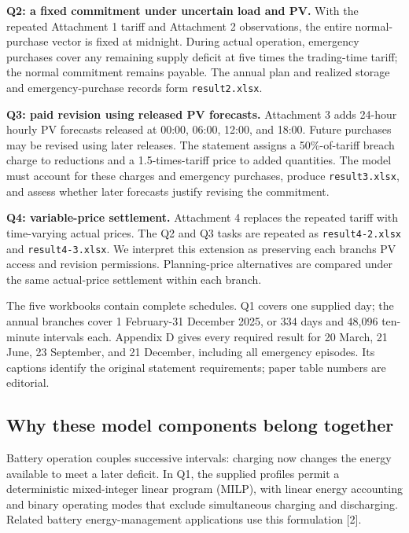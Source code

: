 \textbf{Q2: a fixed commitment under uncertain load and PV.} With the repeated Attachment 1 tariff and Attachment 2 observations, the entire normal-purchase vector is fixed at midnight. During actual operation, emergency purchases cover any remaining supply deficit at five times the trading-time tariff; the normal commitment remains payable. The annual plan and realized storage and emergency-purchase records form \nolinkurl{result2.xlsx}.

\textbf{Q3: paid revision using released PV forecasts.} Attachment 3 adds 24-hour hourly PV forecasts released at 00:00, 06:00, 12:00, and 18:00. Future purchases may be revised using later releases. The statement assigns a 50\%-of-tariff breach charge to reductions and a 1.5-times-tariff price to added quantities. The model must account for these charges and emergency purchases, produce \nolinkurl{result3.xlsx}, and assess whether later forecasts justify revising the commitment.

\textbf{Q4: variable-price settlement.} Attachment 4 replaces the repeated tariff with time-varying actual prices. The Q2 and Q3 tasks are repeated as \nolinkurl{result4-2.xlsx} and \nolinkurl{result4-3.xlsx}. We interpret this extension as preserving each branch\textquotesingle s PV access and revision permissions. Planning-price alternatives are compared under the same actual-price settlement within each branch.

The five workbooks contain complete schedules. Q1 covers one supplied day; the annual branches cover 1 February-31 December 2025, or 334 days and 48,096 ten-minute intervals each. Appendix D gives every required result for 20 March, 21 June, 23 September, and 21 December, including all emergency episodes. Its captions identify the original statement requirements; paper table numbers are editorial.

\subsection{Why these model components belong together}\label{why-these-model-components-belong-together}

Battery operation couples successive intervals: charging now changes the energy available to meet a later deficit. In Q1, the supplied profiles permit a deterministic mixed-integer linear program (MILP), with linear energy accounting and binary operating modes that exclude simultaneous charging and discharging. Related battery energy-management applications use this formulation {[}2{]}.

